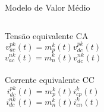\begin{frame}{Modelo de Valor Médio}
\begin{columns}
\centering

Tensão equivalente CA
%
\begin{equation*}
v_{ac}^{pk}(t) = 
m_p^k(t) v_{dc}^{pk}(t)
\end{equation*}
%
\begin{equation*}
v_{ac}^{nk}(t) = 
m_n^k(t) v_{dc}^{nk}(t)
\end{equation*}\\[20pt]


Corrente equivalente CC
%
\begin{equation*}
i_{dc}^{pk}(t) = m_{p}^{k}(t) i_{cp}^k(t)
\end{equation*}    
%
\begin{equation*}
i_{dc}^{nk}(t) = m_{n}^{k}(t) i_{cn}^k(t)
\end{equation*}   

\end{columns}

\end{frame}


